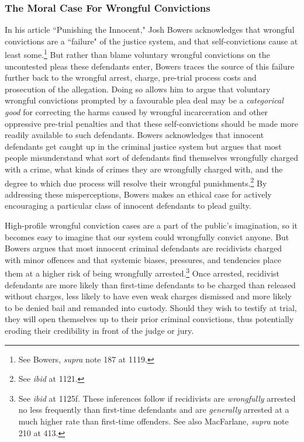 \subsubsection{The Moral Case For Wrongful Convictions}

In his article ``Punishing the Innocent," Josh Bowers acknowledges that wrongful convictions are a ``failure" of the justice system, and that self-convictions cause at least some.\footnote{See Bowers, \textit{supra} note 187 at 1119.} But rather than blame voluntary wrongful convictions on the uncontested pleas these defendants enter, Bowers traces the source of this failure further back to the wrongful arrest, charge, pre-trial process costs and prosecution of the allegation. Doing so allows him to argue that voluntary wrongful convictions prompted by a favourable plea deal may be a \textit{categorical good} for correcting the harms caused by wrongful incarceration and other oppressive pre-trial penalties and that these self-convictions should be made more readily available to such defendants. Bowers acknowledges that innocent defendants get caught up in the criminal justice system but argues that most people misunderstand what sort of defendants find themselves wrongfully charged with a crime, what kinds of crimes they are wrongfully charged with, and the degree to which due process will resolve their wrongful punishments.\footnote{See \textit{ibid} at 1121.} By addressing these misperceptions, Bowers makes an ethical case for actively encouraging a particular class of innocent defendants to plead guilty.

High-profile wrongful conviction cases are a part of the public's imagination, so it becomes easy to imagine that our system could wrongfully convict anyone. But Bowers argues that most innocent criminal defendants are recidivists charged with minor offences and that systemic biases, pressures, and tendencies place them at a higher risk of being wrongfully arrested.\footnote{See \textit{ibid} at 1125f. These inferences follow if recidivists are \textit{wrongfully} arrested no less frequently than first-time defendants and are \textit{generally} arrested at a much higher rate than first-time offenders. See also MacFarlane, \textit{supra} note 210 at 413.} Once arrested, recidivist defendants are more likely than first-time defendants to be charged than released without charges, less likely to have even weak charges dismissed and more likely to be denied bail and remanded into custody. Should they wish to testify at trial, they will open themselves up to their prior criminal convictions, thus potentially eroding their credibility in front of the judge or jury. 

